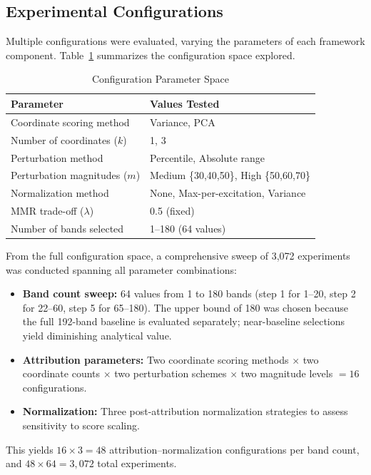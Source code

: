 \subsection{Experimental Configurations}
\label{sec:configurations}

Multiple configurations were evaluated, varying the parameters of each framework component.
Table~\ref{tab:configs} summarizes the configuration space explored.

\begin{table}[!t]
\centering
\caption{Configuration Parameter Space}
\label{tab:configs}
\begin{tabular}{@{}ll@{}}
\toprule
\textbf{Parameter} & \textbf{Values Tested} \\
\midrule
Coordinate scoring method & Variance, PCA \\
Number of coordinates ($k$) & 1, 3 \\
Perturbation method & Percentile, Absolute range \\
Perturbation magnitudes ($m$) & Medium \{30,40,50\}, High \{50,60,70\} \\
Normalization method & None, Max-per-excitation, Variance \\
MMR trade-off ($\lambda$) & 0.5 (fixed) \\
Number of bands selected & 1--180 (64 values) \\
\bottomrule
\end{tabular}
\end{table}

From the full configuration space, a comprehensive sweep of 3,072 experiments was conducted spanning all parameter combinations:
\begin{itemize}
    \item \textbf{Band count sweep:} 64 values from 1 to 180 bands (step 1 for 1--20, step 2 for 22--60, step 5 for 65--180). The upper bound of 180 was chosen because the full 192-band baseline is evaluated separately; near-baseline selections yield diminishing analytical value.
    \item \textbf{Attribution parameters:} Two coordinate scoring methods $\times$ two coordinate counts $\times$ two perturbation schemes $\times$ two magnitude levels $= 16$ configurations.
    \item \textbf{Normalization:} Three post-attribution normalization strategies to assess sensitivity to score scaling.
\end{itemize}
This yields $16 \times 3 = 48$ attribution--normalization configurations per band count, and $48 \times 64 = 3{,}072$ total experiments.


